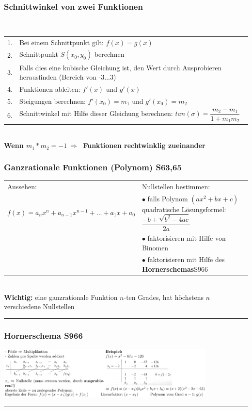 \subsubsection{Schnittwinkel von zwei Funktionen}\
\begin{tabular}{cl}
	1.& Bei einem Schnittpunkt gilt: $f(x) = g(x)$\\
	2.& Schnittpunkt $S(x_{0}, y_{0})$ berechnen\\
	3.& Falls dies eine kubische Gleichung ist, den Wert durch Ausprobieren herausfinden (Bereich von -3...3)\\
	4.& Funktionen ableiten: $f'(x)$ und $g'(x)$\\
	5.& Steigungen berechnen: $f'(x_{0})=m_{1}$ und $g'(x_{0})=m_{2}$\\
	6.& Schnittwinkel mit Hilfe dieser Gleichung berechnen: $tan(\sigma)=\dfrac{m_{2}-m_{1}}{1+m_{1}m_{2}}$\\
\end{tabular}\\
\textbf{Wenn $m_{1}*m_{2}=-1 \ \Rightarrow \ $ Funktionen rechtwinklig zueinander}
\columnbreak

\subsubsection{Ganzrationale Funktionen (Polynom) \color{red}S63,65}
\begin{tabular}{ll}
	Aussehen: & Nullstellen bestimmen:\\
	$f(x)=a_{n}x^{n}+a_{n-1}x^{n-1}+...+a_{1}x+a_{0}$ & $\bullet$ falls Polynom $(ax^{2}+bx+c)$ quadratische Lösungsformel: $\dfrac{-b\pm \sqrt{b^{2}-4ac}}{2a}$\\
	& $\bullet$ faktorisieren mit Hilfe von Binomen\\
	& $\bullet$ faktorisieren mit Hilfe des \textbf{Hornerschemas}\color{red}S966\\
\end{tabular}
\\
\textbf{Wichtig:} eine ganzrationale Funktion $n$-ten Grades, hat höchstens $n$ verschiedene Nullstellen\\
\hrule
\subsubsection{Hornerschema \color{red}S966}
\includegraphics[width=11cm]{images/Horner.PNG}\\
\hrule
